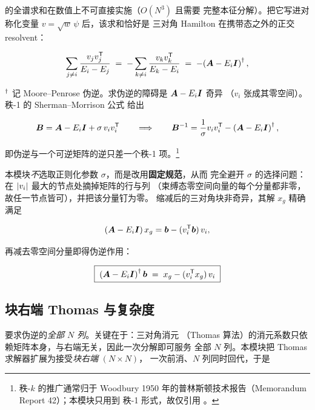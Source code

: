  的全谱求和在数值上不可直接实施（$O(N^{3})$ 且需要
完整本征分解）。把它写进对称化变量 $v=\sqrt{w}\,\psi$ 后，该求和恰好是
三对角 Hamilton 在携带态之外的正交 resolvent：

\begin{equation}
\sum_{j\neq i}\frac{v_j v_j^{\mathsf{T}}}{E_{i}-E_{j}}
\;=\; -\sum_{k\neq i}\frac{v_k v_k^{\mathsf{T}}}{E_k-E_{i}}
\;=\; -\!\left(\bm{A}-E_{i}\bm{I}\right)^{\dagger},
\label{eq:resolvent}
\end{equation}

$^{\dagger}$ 记 Moore--Penrose 伪逆。求伪逆的障碍是 $\bm{A}-E_{i}\bm{I}$ 奇异
（$v_i$ 张成其零空间）。秩-1 的 Sherman--Morrison 公式
\cite{shermanMorrison1950} 给出

\begin{equation}
\bm{B} = \bm{A}-E_{i}\bm{I}+\sigma\,v_i v_i^{\mathsf{T}}
\qquad\Longrightarrow\qquad
\bm{B}^{-1} = \frac{1}{\sigma}v_i v_i^{\mathsf{T}} - \left(\bm{A}-E_{i}\bm{I}\right)^{\dagger},
\label{eq:woodbury}
\end{equation}

即伪逆与一个可逆矩阵的逆只差一个秩-1 项。\footnote{秩-$k$ 的推广通常归于
Woodbury 1950 年的普林斯顿技术报告（Memorandum Report 42）；本模块只用到
秩-1 形式，故仅引用 \cite{shermanMorrison1950}。}

本模块\emph{不}选取正则化参数 $\sigma$，而是改用\textbf{固定规范}，从而
完全避开 $\sigma$ 的选择问题：在 $\left\lvert v_i \right\rvert$ 最大的节点处摘掉矩阵的行与列
（束缚态零空间向量的每个分量都非零，故任一节点皆可），并把该分量钉为零。
缩减后的三对角块非奇异，其解 $x_g$ 精确满足

\begin{equation}
\left(\bm{A}-E_{i}\bm{I}\right)x_g = \bm{b} - (v_i^{\mathsf{T}}\bm{b})\,v_i ,
\label{eq:gauge-system}
\end{equation}

再减去零空间分量即得伪逆作用：

\begin{equation}
\boxed{\;
\left(\bm{A}-E_{i}\bm{I}\right)^{\dagger}\bm{b}
\;=\; x_g - (v_i^{\mathsf{T}} x_g)\,v_i
\;}
\label{eq:pseudoinverse}
\end{equation}

\subsection{块右端 Thomas 与复杂度}
\label{sec:sp1d-thomas}

 要求伪逆的\emph{全部 $N$ 列}。关键在于：三对角消元
（Thomas 算法）的消元系数只依赖矩阵本身，与右端无关，因此一次分解即可服务
全部 $N$ 列。本模块把 Thomas 求解器扩展为接受\emph{块右端} $(N\times N)$，
一次前消、$N$ 列同时回代，于是


